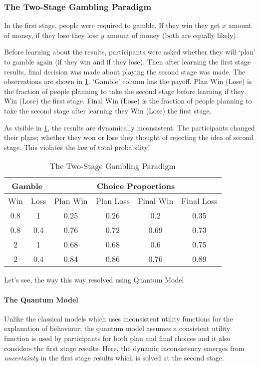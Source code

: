 \subsubsection{The Two-Stage Gambling Paradigm}
In the first stage, people were required to gamble. If they win they get $x$ amount of money, if they lose they lose $y$ amount of money (both are equally likely).

Before learning about the results, participants were asked whether they will `plan' to gamble again (if they win and if they lose). Then after learning the first stage results, final decision was made about playing the second stage was made. The observations are shown in \ref{tab:ttsgp}. `Gamble' column has the payoff. Plan Win (Lose) is the fraction of people planning to take the second stage before learning if they Win (Lose) the first stage. Final Win (Lose) is the fraction of people planning to take the second stage after learning they Win (Lose) the first stage.

As visible in \ref{tab:ttsgp}, the results are dynamically inconsistent. The participants changed their plans; whether they won or lose they thought of rejecting the idea of second stage. This violates the law of total probability!
\begin{table}[H]
\centering
\begin{tabular}{cccccc}
\hline
\multicolumn{2}{c}{Gamble} & \multicolumn{4}{c}{Choice Proportions} \\ \hline
Win & Loss & Plan Win & Plan Loss & Final Win & Final Loss \\ \hline
0.8 & 1 & 0.25 & 0.26 & 0.2 & 0.35 \\
0.8 & 0.4 & 0.76 & 0.72 & 0.69 & 0.73 \\
\multicolumn{1}{c}{2} & \multicolumn{1}{c}{1} & \multicolumn{1}{c}{0.68} & \multicolumn{1}{c}{0.68} & \multicolumn{1}{c}{0.6} & \multicolumn{1}{c}{0.75} \\
2 & 0.4 & 0.84 & 0.86 & 0.76 & 0.89\\\hline
\end{tabular}
\vspace{1em}
\caption{The Two-Stage Gambling Paradigm}
\label{tab:ttsgp}
\end{table}
Let's see, the way this way resolved using Quantum Model
\paragraph{The Quantum Model}
Unlike the classical models which uses inconsistent utility functions for the explanation of behaviour; the quantum model assumes a consistent utility function is used by participants for both plan and final choices and it also considers the first stage results. Here, the dynamic inconsistency emerges from \emph{uncertainty} in the first stage results which is solved at the second stage.

